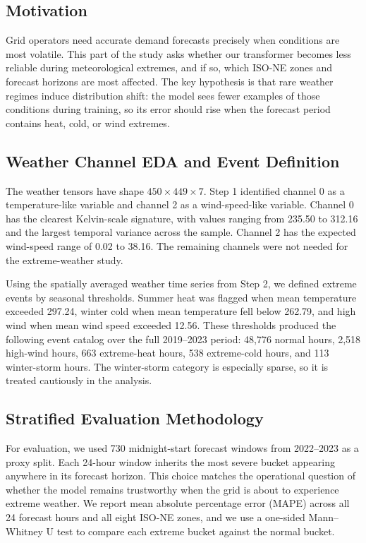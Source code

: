 \subsection{Motivation}
\label{subsec:part3-motivation}

Grid operators need accurate demand forecasts precisely when conditions are most volatile. This part of the study asks whether our transformer becomes less reliable during meteorological extremes, and if so, which ISO-NE zones and forecast horizons are most affected. The key hypothesis is that rare weather regimes induce distribution shift: the model sees fewer examples of those conditions during training, so its error should rise when the forecast period contains heat, cold, or wind extremes.

\subsection{Weather Channel EDA and Event Definition}
\label{subsec:part3-eda}

The weather tensors have shape $450\times 449\times 7$. Step 1 identified channel 0 as a temperature-like variable and channel 2 as a wind-speed-like variable. Channel 0 has the clearest Kelvin-scale signature, with values ranging from 235.50 to 312.16 and the largest temporal variance across the sample. Channel 2 has the expected wind-speed range of 0.02 to 38.16. The remaining channels were not needed for the extreme-weather study.

Using the spatially averaged weather time series from Step 2, we defined extreme events by seasonal thresholds. Summer heat was flagged when mean temperature exceeded 297.24, winter cold when mean temperature fell below 262.79, and high wind when mean wind speed exceeded 12.56. These thresholds produced the following event catalog over the full 2019--2023 period: 48,776 normal hours, 2,518 high-wind hours, 663 extreme-heat hours, 538 extreme-cold hours, and 113 winter-storm hours. The winter-storm category is especially sparse, so it is treated cautiously in the analysis.

\subsection{Stratified Evaluation Methodology}
\label{subsec:part3-method}

For evaluation, we used 730 midnight-start forecast windows from 2022--2023 as a proxy split. Each 24-hour window inherits the most severe bucket appearing anywhere in its forecast horizon. This choice matches the operational question of whether the model remains trustworthy when the grid is about to experience extreme weather. We report mean absolute percentage error (MAPE) across all 24 forecast hours and all eight ISO-NE zones, and we use a one-sided Mann--Whitney U test to compare each extreme bucket against the normal bucket.

